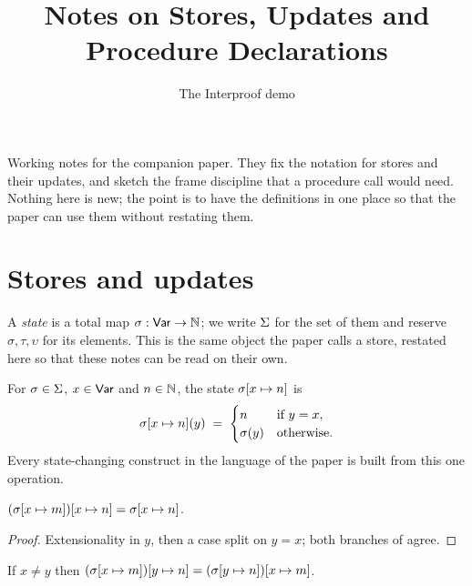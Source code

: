 \documentclass[11pt,a4paper]{article}
\title{Notes on Stores, Updates and Procedure Declarations}
\author{The Interproof demo}
\date{}
\begin{document}
\maketitle

\noindent
Working notes for the companion paper. They fix the notation for stores and
their updates, and sketch the frame discipline that a procedure call would
need. Nothing here is new; the point is to have the definitions in one place so
that the paper can use them without restating them.

\section{Stores and updates}
\label{sec:note-stores}

\begin{definition}[states]
\label{def:state}
A \emph{state} is a total map $\sigma : \mathsf{Var} \to \mathbb{N}$; we write $\Sigma$ for
the set of them and reserve $\sigma, \tau, \upsilon$ for its elements. This is
the same object the paper calls a store, restated here so that these notes can
be read on their own.
\end{definition}

\begin{definition}
\label{def:update}
For $\sigma \in \Sigma$, $x \in \mathsf{Var}$ and $n \in \mathbb{N}$, the state
$\sigma[x \mapsto n]$ is
\[
  \sigma[x \mapsto n](y) \;=\;
  \begin{cases}
    n & \text{if } y = x, \\
    \sigma(y) & \text{otherwise.}
  \end{cases}
\]
Every state-changing construct in the language of the paper is built from this
one operation.
\end{definition}

\begin{lemma}[shadowing]
\label{lem:update-shadow}
$(\sigma[x \mapsto m])[x \mapsto n] = \sigma[x \mapsto n]$.
\end{lemma}

\begin{proof}
Extensionality in $y$, then a case split on $y = x$; both branches of
 agree.
\end{proof}

\begin{lemma}
\label{lem:update-comm}
If $x \ne y$ then
$(\sigma[x \mapsto m])[y \mapsto n] = (\sigma[y \mapsto n])[x \mapsto m]$.
\end{lemma}
\end{document}
